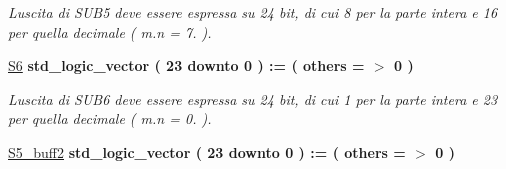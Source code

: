 \begin{DoxyCompactItemize}
\begin{DoxyCompactList}\small\item\em L\textquotesingle{}uscita di S\+U\+B5 deve essere espressa su 24 bit, di cui 8 per la parte intera e 16 per quella decimale ( m.\+n = 7. ). \end{DoxyCompactList}\item 
\hyperlink{group___linear_regression_gaad1e5951d0d38888c5deafab1b89df1a}{S6} {\bfseries \textcolor{vhdlchar}{std\+\_\+logic\+\_\+vector}\textcolor{vhdlchar}{ }\textcolor{vhdlchar}{(}\textcolor{vhdlchar}{ }\textcolor{vhdlchar}{ } \textcolor{vhdldigit}{23} \textcolor{vhdlchar}{ }\textcolor{vhdlchar}{downto}\textcolor{vhdlchar}{ }\textcolor{vhdlchar}{ } \textcolor{vhdldigit}{0} \textcolor{vhdlchar}{ }\textcolor{vhdlchar}{)}\textcolor{vhdlchar}{ }\textcolor{vhdlchar}{ }\textcolor{vhdlchar}{ }\textcolor{vhdlchar}{\+:}\textcolor{vhdlchar}{=}\textcolor{vhdlchar}{ }\textcolor{vhdlchar}{(}\textcolor{vhdlchar}{ }\textcolor{vhdlchar}{ }\textcolor{vhdlchar}{others}\textcolor{vhdlchar}{ }\textcolor{vhdlchar}{ }\textcolor{vhdlchar}{=}\textcolor{vhdlchar}{ }\textcolor{vhdlchar}{$>$}\textcolor{vhdlchar}{ }\textcolor{vhdlchar}{\textquotesingle{}}\textcolor{vhdlchar}{ } \textcolor{vhdldigit}{0} \textcolor{vhdlchar}{ }\textcolor{vhdlchar}{\textquotesingle{}}\textcolor{vhdlchar}{ }\textcolor{vhdlchar}{)}\textcolor{vhdlchar}{ }} 
\begin{DoxyCompactList}\small\item\em L\textquotesingle{}uscita di S\+U\+B6 deve essere espressa su 24 bit, di cui 1 per la parte intera e 23 per quella decimale ( m.\+n = 0. ). \end{DoxyCompactList}\item 
\hyperlink{group___linear_regression_ga549acc079099c46203bf0354c074168e}{S5\+\_\+buff2} {\bfseries \textcolor{vhdlchar}{std\+\_\+logic\+\_\+vector}\textcolor{vhdlchar}{ }\textcolor{vhdlchar}{(}\textcolor{vhdlchar}{ }\textcolor{vhdlchar}{ } \textcolor{vhdldigit}{23} \textcolor{vhdlchar}{ }\textcolor{vhdlchar}{downto}\textcolor{vhdlchar}{ }\textcolor{vhdlchar}{ } \textcolor{vhdldigit}{0} \textcolor{vhdlchar}{ }\textcolor{vhdlchar}{)}\textcolor{vhdlchar}{ }\textcolor{vhdlchar}{ }\textcolor{vhdlchar}{ }\textcolor{vhdlchar}{\+:}\textcolor{vhdlchar}{=}\textcolor{vhdlchar}{ }\textcolor{vhdlchar}{(}\textcolor{vhdlchar}{ }\textcolor{vhdlchar}{ }\textcolor{vhdlchar}{others}\textcolor{vhdlchar}{ }\textcolor{vhdlchar}{ }\textcolor{vhdlchar}{=}\textcolor{vhdlchar}{ }\textcolor{vhdlchar}{$>$}\textcolor{vhdlchar}{ }\textcolor{vhdlchar}{\textquotesingle{}}\textcolor{vhdlchar}{ } \textcolor{vhdldigit}{0} \textcolor{vhdlchar}{ }\textcolor{vhdlchar}{\textquotesingle{}}\textcolor{vhdlchar}{ }\textcolor{vhdlchar}{)}\textcolor{vhdlchar}{ }} 

\end{DoxyCompactItemize}
